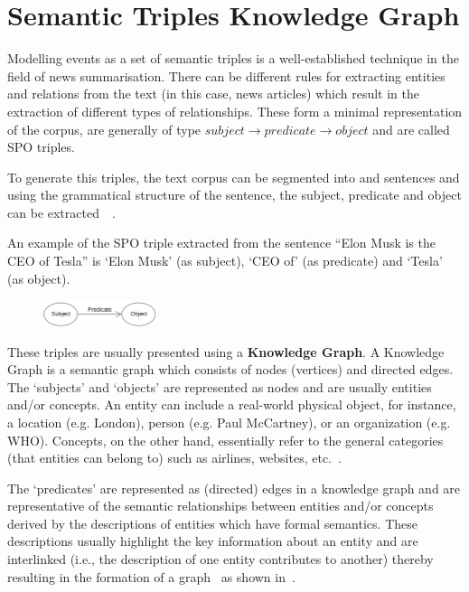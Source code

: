 \section{Semantic Triples Knowledge Graph}  \label{Knowledge_graph}

Modelling events as a set of semantic triples is a well-established technique in the field of news summarisation. There can be different rules for extracting entities and relations from the text (in this case, news articles) which result in the extraction of different types of relationships. These form a minimal representation of the corpus, are generally of type $subject \rightarrow predicate \rightarrow object$ and are called SPO triples.

To generate this triples, the text corpus can be segmented into and sentences and using the grammatical structure of the sentence, the subject, predicate and object can be extracted~\cite{retrospective_kg}~\cite{6_world2014rdf}.

An example of the SPO triple extracted from the sentence ``Elon Musk is the CEO of Tesla'' is `Elon Musk' (as subject), `CEO of' (as predicate) and `Tesla' (as object).

\begin{figure}[H]
    \centering
    \includegraphics[width=0.3\textwidth]{images/spo.png}
\end{figure}

These triples are usually presented using a \textbf{Knowledge Graph}. A Knowledge Graph is a semantic graph which consists of nodes (vertices) and directed edges. The `subjects' and `objects' are represented as nodes and are usually entities and/or concepts. An entity can include a real-world physical object, for instance, a location (e.g. London), person (e.g. Paul McCartney), or an organization (e.g. WHO). Concepts, on the other hand, essentially refer to the general categories (that entities can belong to) such as airlines, websites, etc.~\cite{retrospective_kg}.

The `predicates' are represented as (directed) edges in a knowledge graph and are representative of the semantic relationships between entities and/or concepts derived by the descriptions of entities which have formal semantics. These descriptions usually highlight the key information about an entity and are interlinked (i.e., the description of one entity contributes to another) thereby resulting in the formation of a graph~\cite{retrospective_kg} as shown in~.

